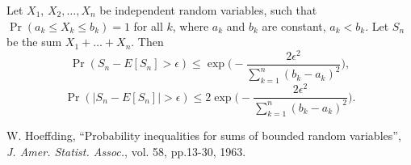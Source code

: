 \documentclass[12pt]{article}
\begin{document}
Let $X_1$, $X_2, \ldots, X_n$ be independent random variables, such that $\Pr(a_k \leq X_k \leq b_k)= 1$ for all $k$, where $a_k$ and $b_k$ are constant, $a_k<b_k$. Let $S_n$ be the sum $X_1+\ldots+X_n$. Then
\[
\Pr(S_n - E[S_n] > \epsilon) \leq \exp\Big( - \frac{2 \epsilon^2}{\sum_{k=1}^n(b_k-a_k)^2} \Big),
\]
\[
\Pr(|S_n - E[S_n]| > \epsilon) \leq 2 \exp\Big( - \frac{2 \epsilon^2}{\sum_{k=1}^n(b_k-a_k)^2} \Big).
\]



\begin{thebibliography}{1}
 W. Hoeffding, ``Probability inequalities for sums of bounded random variables'',  \emph{J. Amer. Statist. Assoc.}, vol. 58, pp.13-30, 1963. 

\end{thebibliography}

\end{document}

